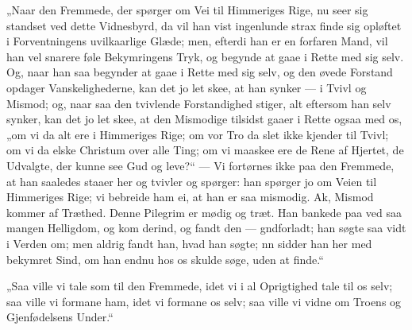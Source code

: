 \documentclass[12pt,a4paper]{book}
\begin{document}
„Naar den Fremmede, der spørger om Vei til Himmeriges Rige, nu seer sig standset ved dette
Vidnesbyrd, da vil han vist ingenlunde strax finde sig opløftet i Forventningens
uvilkaarlige Glæde; men, efterdi han er en forfaren Mand, vil han vel snarere føle
Bekymringens Tryk, og begynde at gaae i Rette med sig selv. Og, naar han saa begynder at
gaae i Rette med sig selv, og den øvede Forstand opdager Vanskelighederne, kan det jo let
skee, at han synker --- i Tvivl og Mismod; og, naar saa den tvivlende Forstandighed stiger,
alt eftersom han selv synker, kan det jo let skee, at den Mismodige tilsidst gaaer i Rette
ogsaa med os, „om vi da alt ere i Himmeriges Rige; om vor Tro da slet ikke kjender til
Tvivl; om vi da elske Christum over alle Ting; om vi maaskee ere de Rene af Hjertet, de
Udvalgte, der kunne see Gud og leve?“ --- Vi fortørnes ikke paa den Fremmede, at han
saaledes staaer her og tvivler og spørger: han spørger jo om Veien til Himmeriges Rige; vi
bebreide ham ei, at han er saa mismodig. Ak, Mismod kommer af Træthed. Denne Pilegrim er
mødig og træt. Han bankede paa ved saa mangen Helligdom, og kom derind, og fandt den ---
gndforladt; han søgte saa vidt i Verden om; men aldrig fandt han, hvad han søgte;
nn sidder han her med bekymret Sind, om han endnu hos os skulde søge, uden at finde.“

„Saa ville vi tale som til den Fremmede, idet vi i al Oprigtighed tale til os selv; saa
ville vi formane ham, idet vi formane os selv; saa ville vi vidne om Troens og
Gjenfødelsens Under.“
\end{document}

